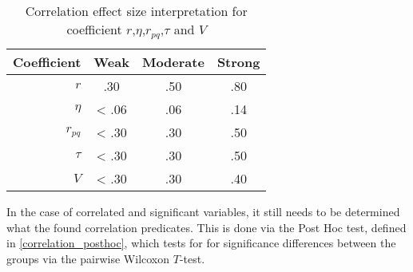 \begin{table}[ht]
	\centering
	\begin{tabular}{r|c|c|c}  
		\toprule
		Coefficient & Weak 	& Moderate 	& Strong \\
		\midrule
		$r$ 		& .30	& .50		& .80 \\
		$\eta$ 		& < .06 & .06		& .14 \\
		$r_{pq}$	& < .30	& .30		& .50 \\
		$\tau$ 		& < .30	& .30		& .50 \\
		$V$ 		& < .30	& .30		& .40 \\
		\bottomrule
	\end{tabular}
	\caption{Correlation effect size interpretation for coefficient $r$,$\eta$,$r_{pq}$,$\tau$ and $V$}
	\label{tbl:correlation_interpretation_guidelines}
\end{table}

In the case of correlated and significant variables, it still needs to be determined what the found correlation predicates. This is done via the Post Hoc test, defined in \cref{correlation_posthoc}, which tests for for significance differences between the groups via the pairwise Wilcoxon $T$-test.












